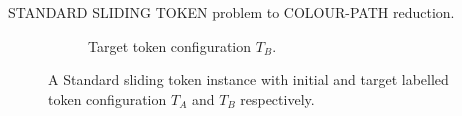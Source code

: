 \begin{example}{STANDARD SLIDING TOKEN problem to COLOUR-PATH reduction. \\}
\begin{figure}[H]
\begin{subfigure}[b]{0.4\textwidth}
\begin{scaletikzpicturetowidth}{\textwidth}
            \end{scaletikzpicturetowidth}
            \caption{Target token configuration $T_{B}$.}
            \label{fig:standard_2}
        \end{subfigure}
        \caption{A Standard sliding token instance with initial and target labelled token configuration $T_{A}$ and $T_{B}$ respectively.}
        \label{fig:input_instance_standard}
    \end{figure}


\end{example}
